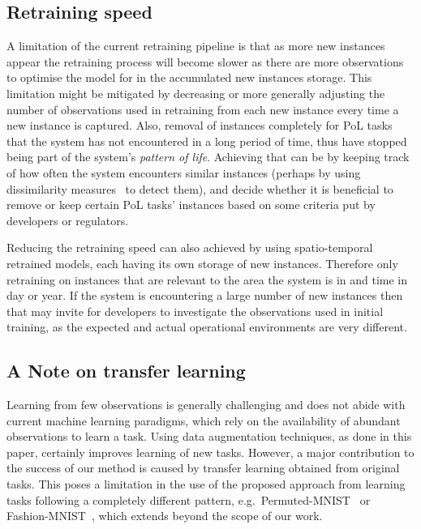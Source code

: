 \subsection{Retraining speed}
A limitation of the current retraining pipeline is that as more new instances appear the retraining process will become slower as there are more observations to optimise the model for in the accumulated new instances storage.
%
This limitation might be mitigated by decreasing or more generally adjusting the number of observations used in retraining from each new instance every time a new instance is captured.
%
%
Also, removal of instances completely
for PoL tasks that the system has not encountered in a long period of time, thus have stopped being part of the system's \textit{pattern of life}. 
%
%
%
Achieving that can be by keeping track of how often the system encounters similar instances (perhaps by using dissimilarity measures~\cite{Hond2020} to detect them), and decide whether it is beneficial to remove or keep certain PoL tasks' instances based on some criteria put by developers or regulators. 
%

Reducing the retraining speed can also achieved by using spatio-temporal retrained models, each having its own storage of new instances. Therefore only retraining on instances that are relevant to the area the system is in and time in day or year.
%
If the system is encountering a large number of new instances then that may invite for developers to investigate the observations used in initial training, as the expected and actual operational environments are very different. 

\subsection{A Note on transfer learning}
Learning from few observations is generally challenging and does not abide with current machine learning paradigms, which rely on the availability of abundant observations to learn a task. 
%
Using data augmentation techniques, as done in this paper, certainly improves learning of new tasks. 
%
However, a major contribution to the success of our method is caused by transfer learning obtained from original tasks. 
%
This poses a limitation in the use of the proposed approach from learning tasks following a completely different pattern, e.g.\ Permuted-MNIST~\cite{Goodfellow2014} or Fashion-MNIST~\cite{Xiao2017}, which extends beyond the scope of our work.


